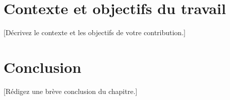 \section{Contexte et objectifs du travail}
[Décrivez le contexte et les objectifs de votre contribution.]

\section{Conclusion}
[Rédigez une brève conclusion du chapitre.]
